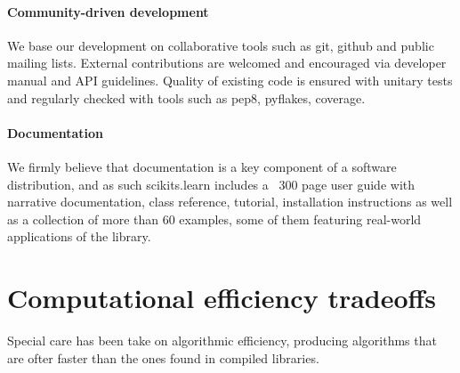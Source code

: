 \documentclass[twoside,11pt]{article}
\begin{document}
\paragraph{Community-driven development}

We base our development on collaborative tools such as git, github and
public mailing lists. External contributions are welcomed and
encouraged via developer manual and API guidelines. Quality of
existing code is ensured with unitary tests and regularly checked with
tools such as pep8, pyflakes, coverage.




\paragraph{Documentation}

We firmly believe that documentation is a key component of a software
distribution, and as such scikits.learn includes a ~300 page user
guide with narrative documentation, class reference, tutorial,
installation instructions as well as a collection of more than 60
examples, some of them featuring real-world applications of the
library.


\section{Computational efficiency tradeoffs}


Special care has been take on algorithmic efficiency, producing
algorithms that are ofter faster than the ones found in compiled
libraries.
\end{document}
